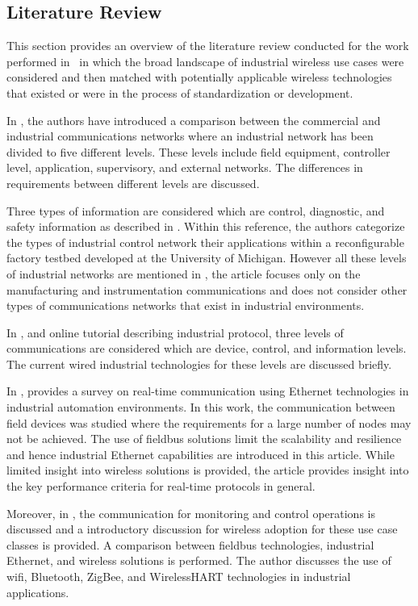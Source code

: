 \subsection{Literature Review}\label{sec:litreview:academia}

This section provides an overview of the literature review conducted for the work performed in~\cite{CandellRW2017} in which the broad landscape of industrial wireless use cases were considered and then matched with potentially applicable wireless technologies that existed or were in the process of standardization or development.  

In \cite{Galloway2013}, the authors have introduced a comparison between the commercial and industrial communications networks where an industrial network has been divided to five different levels. These levels include field equipment, controller level, application, supervisory, and external networks. The differences in requirements between different levels are discussed. 

Three types of information are considered which are control, diagnostic, and safety information as described in \cite{Moyne2007}.  Within this reference, the authors categorize the types of industrial control network their applications within a reconfigurable factory testbed developed at the University of Michigan. However all these levels of industrial networks are mentioned in \cite{Galloway2013}, the article focuses only on the manufacturing and instrumentation communications and does not consider other types of communications networks that exist in industrial environments. 

In \cite{What2017}, and online tutorial describing industrial protocol, three levels of communications are considered which are device, control, and information levels. The current wired industrial technologies for these levels are discussed briefly. 

In \cite{Danielis2014}, provides a survey on real-time communication using Ethernet technologies in industrial automation environments.  In this work, the communication between field devices was studied where the requirements for a large number of nodes may not be achieved. The use of fieldbus solutions limit the scalability and resilience and hence industrial Ethernet capabilities are introduced in this article. While limited insight into wireless solutions is provided, the article provides insight into the key performance criteria for real-time protocols in general.

Moreover, in \cite{Connectivity}, the communication for monitoring and control operations is discussed and a introductory discussion for wireless adoption for these use case classes is provided. A comparison between fieldbus technologies, industrial Ethernet, and wireless solutions is performed. The author discusses the use of \gls{wifi}, Bluetooth, ZigBee, and WirelessHART technologies in industrial applications. 

